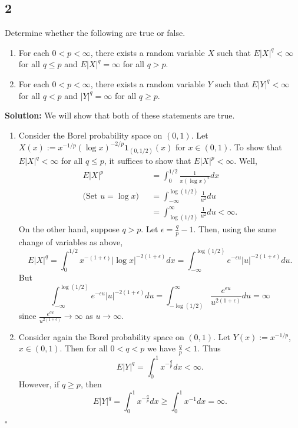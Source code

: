 \documentclass[12pt]{article}
\newcounter{ProofCounter}
\newenvironment{Solution}{\stepcounter{ProofCounter}\textbf{Solution:}}{\hfill$\square$}
\begin{document}
\subsection*{2}
\begin{tcolorbox}
  Determine whether the following are true or false.
  \begin{enumerate}
    \item For each $0 < p < \infty$, there exists a random variable $X$ such that $E|X|^{q} < \infty$ for all $q \leq p$ and $E|X|^{q} = \infty$ for all $q > p$.
    \item For each $0 < p < \infty$, there exists a random variable $Y$ such that $E|Y|^{q} < \infty$ for all $q < p$ and $|Y|^{q} = \infty$ for all $q \geq p$.
  \end{enumerate}
\end{tcolorbox}
\begin{Solution}
  We will show that both of these statements are true.

  \begin{enumerate}
    \item

      Consider the Borel probability space on $(0, 1)$. Let $X(x) := x^{-1/p} (\log x)^{-2/p} \bm{1}_{(0, 1/2)}(x)$ for $x \in (0, 1)$. To show that $E|X|^{q} < \infty$ for all $q \leq p$, it suffices to show that $E|X|^{p} < \infty$. Well,
      \begin{align*}
        E|X|^{p} & = \int_{0}^{1/2} \frac{1}{x(\log x)^2} dx \\
        \text{(Set $u = \log x$)}\ \ \ & = \int_{-\infty}^{\log (1/2)} \frac{1}{u^2} du \\
        & = \int_{\log(1/2)}^{\infty} \frac{1}{u^2} du < \infty.
      \end{align*}
      On the other hand, suppose $q > p$. Let $\epsilon = \frac{q}{p} - 1$. Then, using the same change of variables as above,
      \[
        E|X|^{q} = \int_{0}^{1/2} x^{-(1 + \epsilon)} |\log x|^{-2(1+\epsilon)} dx = \int_{-\infty}^{\log(1/2)} e^{-\epsilon u} |u|^{-2(1+\epsilon)} du.
      \]
      But
      \[
        \int_{-\infty}^{\log(1/2)} e^{-\epsilon u} |u|^{-2(1+\epsilon)} du = \int_{-\log(1/2)}^{\infty} \frac{e^{\epsilon u}}{u^{2(1 + \epsilon)}} du = \infty
      \]
      since $\frac{e^{\epsilon u}}{u^{2(1 + \epsilon)}} \rightarrow \infty$ as $u \rightarrow \infty$.

    \item

      Consider again the Borel probability space on $(0, 1)$. Let $Y(x) := x^{-1/p}$, $x \in (0, 1)$. Then for all $0 < q < p$ we have $\frac{q}{p} < 1$. Thus
      \[
        E|Y|^{q} = \int_{0}^{1} x^{-\frac{q}{p}}dx < \infty.
      \]
      However, if $q \geq p$, then
      \[
        E|Y|^{q} = \int_{0}^{1} x^{-\frac{q}{p}}dx \geq \int_{0}^{1} x^{-1} dx = \infty.
      \]
  \end{enumerate}
\end{Solution}
\end{document}
